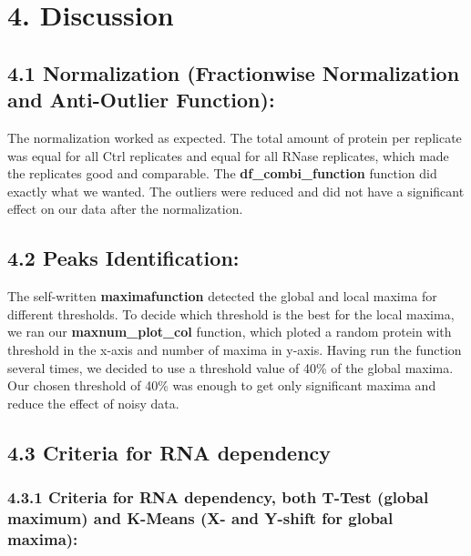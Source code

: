 \documentclass[
]{article}
\begin{document}
\hypertarget{discussion}{%
\section{4. Discussion}\label{discussion}}

\hypertarget{normalization-fractionwise-normalization-and-anti-outlier-function}{%
\subsection{4.1 Normalization (Fractionwise Normalization and
Anti-Outlier
Function):}\label{normalization-fractionwise-normalization-and-anti-outlier-function}}

The normalization worked as expected. The total amount of protein per
replicate was equal for all Ctrl replicates and equal for all RNase
replicates, which made the replicates good and comparable. The
\textbf{df\_combi\_function} function did exactly what we wanted. The
outliers were reduced and did not have a significant effect on our data
after the normalization.

\hypertarget{peaks-identification-2}{%
\subsection{4.2 Peaks Identification:}\label{peaks-identification-2}}

The self-written \textbf{maximafunction} detected the global and local
maxima for different thresholds. To decide which threshold is the best
for the local maxima, we ran our \textbf{maxnum\_plot\_col} function,
which ploted a random protein with threshold in the x-axis and number of
maxima in y-axis. Having run the function several times, we decided to
use a threshold value of 40\% of the global maxima. Our chosen threshold
of 40\% was enough to get only significant maxima and reduce the effect
of noisy data.

\hypertarget{criteria-for-rna-dependency-2}{%
\subsection{4.3 Criteria for RNA
dependency}\label{criteria-for-rna-dependency-2}}

\hypertarget{criteria-for-rna-dependency-both-t-test-global-maximum-and-k-means-x--and-y-shift-for-global-maxima}{%
\subsubsection{4.3.1 Criteria for RNA dependency, both T-Test (global
maximum) and K-Means (X- and Y-shift for global
maxima):}\label{criteria-for-rna-dependency-both-t-test-global-maximum-and-k-means-x--and-y-shift-for-global-maxima}}
\end{document}
